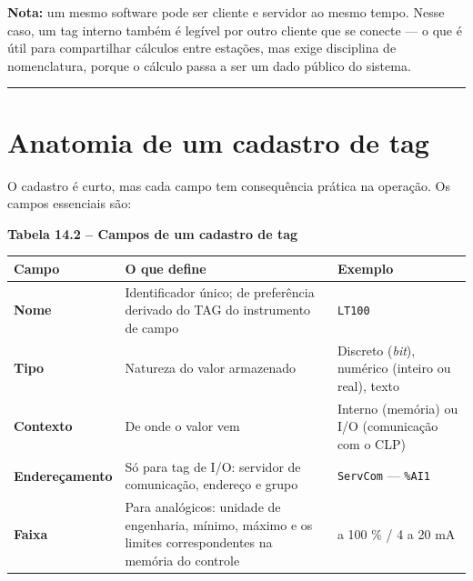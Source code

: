 \begin{caixanota}

\textbf{Nota:} um mesmo software pode ser cliente e servidor ao mesmo tempo. Nesse caso, um tag interno também é legível por outro cliente que se conecte --- o que é útil para compartilhar cálculos entre estações, mas exige disciplina de nomenclatura, porque o cálculo passa a ser um dado público do sistema.

\end{caixanota}

\begin{center}\rule{0.5\linewidth}{0.5pt}\end{center}

\section{Anatomia de um cadastro de tag}\label{anatomia-de-um-cadastro-de-tag}

O cadastro é curto, mas cada campo tem consequência prática na operação. Os campos essenciais são:

\textbf{Tabela 14.2 -- Campos de um cadastro de tag}

\begin{longtable}[]{@{}
  >{\raggedright\arraybackslash}p{}
  >{\raggedright\arraybackslash}p{}
  >{\raggedright\arraybackslash}p{}@{}}
\toprule\noalign{}
\begin{minipage}[b]{\linewidth}\raggedright
Campo
\end{minipage} & \begin{minipage}[b]{\linewidth}\raggedright
O que define
\end{minipage} & \begin{minipage}[b]{\linewidth}\raggedright
Exemplo
\end{minipage} \\
\midrule\noalign{}
\endhead
\bottomrule\noalign{}
\endlastfoot
\textbf{Nome} & Identificador único; de preferência derivado do TAG do instrumento de campo & \passthrough{\lstinline!LT100!} \\
\textbf{Tipo} & Natureza do valor armazenado & Discreto (\emph{bit}), numérico (inteiro ou real), texto \\
\textbf{Contexto} & De onde o valor vem & Interno (memória) ou I/O (comunicação com o CLP) \\
\textbf{Endereçamento} & Só para tag de I/O: servidor de comunicação, endereço e grupo & \passthrough{\lstinline!ServCom!} --- \passthrough{\lstinline!\%AI1!} \\
\textbf{Faixa} & Para analógicos: unidade de engenharia, mínimo, máximo e os limites correspondentes na memória do controle & 0 a 100 \% / 4 a 20 mA \\
\end{longtable}

